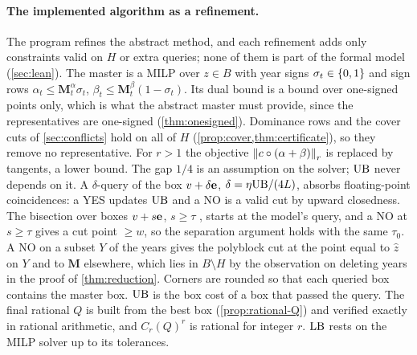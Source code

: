 \paragraph{The implemented algorithm as a refinement.}
The program refines the abstract method, and each refinement adds only constraints valid on $H$ or extra queries; none of them is part of the formal model (\cref{sec:lean}). The master is a MILP over $z\in B$ with year signs $\sigma_t\in\left\{ 0,1 \right\}$ and sign rows $\alpha_t\le\mathbf M^\alpha_t\sigma_t$, $\beta_t\le\mathbf M^\beta_t(1-\sigma_t)$. Its dual bound is a bound over one-signed points only, which is what the abstract master must provide, since the representatives are one-signed (\cref{thm:onesigned}). Dominance rows and the cover cuts of \cref{sec:conflicts} hold on all of $H$ (\cref{prop:cover,thm:certificate}), so they remove no representative. For $r>1$ the objective $\left\lVert c\circ(\alpha+\beta) \right\rVert_r$ is replaced by tangents, a lower bound. The gap $1/4$ is an assumption on the solver; $\mathrm{UB}$ never depends on it. A $\delta$-query of the box $v+\delta\mathbf e$, $\delta=\eta\mathrm{UB}/(4L)$, absorbs floating-point coincidences: a YES updates $\mathrm{UB}$ and a NO is a valid cut by upward closedness. The bisection over boxes $v+s\mathbf e$, $s\ge\tau$ \citep[p.~479]{Tuy2000}, starts at the model's query, and a NO at $s\ge\tau$ gives a cut point $\ge w$, so the separation argument holds with the same $\tau_0$. A NO on a subset $Y$ of the years gives the polyblock cut at the point equal to $\hat z$ on $Y$ and to $\mathbf M$ elsewhere, which lies in $B\setminus H$ by the observation on deleting years in the proof of \cref{thm:reduction}. Corners are rounded so that each queried box contains the master box. $\mathrm{UB}$ is the box cost of a box that passed the query. The final rational $Q$ is built from the best box (\cref{prop:rational-Q}) and verified exactly in rational arithmetic, and $C_r(Q)^r$ is rational for integer $r$. $\mathrm{LB}$ rests on the MILP solver up to its tolerances.

